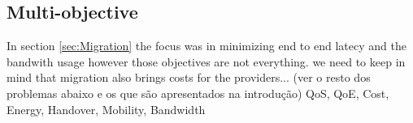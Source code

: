 



\subsection{Multi-objective}
\label{sec:Multiobjective}
In section \ref{sec:Migration} the focus was in minimizing end to end latecy and the bandwith usage however those objectives are not everything. we need to keep in mind that migration also brings costs for the providers... (ver o resto dos problemas abaixo e os que são apresentados na introdução)
QoS, QoE, Cost, Energy, Handover, Mobility, Bandwidth



\vfill\pagebreak
